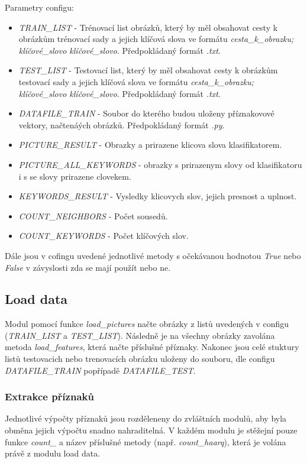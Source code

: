 \documentclass[czech,BP]{thesiskiv}
\begin{document}
\vspace{1cm}
Parametry configu:
\begin{itemize}
	\item \textit{TRAIN\_LIST} - Trénovací list obrázků, který by měl obsahovat cesty k obrázkům trénovací sady a jejich klíčová slova ve formátu \textit{cesta\_k\_obrazku; klíčové\_slovo klíčové\_slovo}. Předpokládaný formát \textit{.txt}.
	\item \textit{TEST\_LIST} - Testovací list, který by měl obsahovat cesty k obrázkům testovací sady a jejich klíčová slova ve formátu \textit{cesta\_k\_obrazku; klíčové\_slovo klíčové\_slovo}. Předpokládaný formát \textit{.txt}.
	\item \textit{DATAFILE\_TRAIN} - Soubor do kterého budou uloženy příznakovové vektory, načtenáých obrázků. Předpokládaný formát \textit{.py}.
	\item \textit{PICTURE\_RESULT} - Obrazky a prirazene klicova slova klasifikatorem.
	\item \textit{PICTURE\_ALL\_KEYWORDS} - obrazky s prirazenym slovy od klasifikatoru i s se slovy prirazene clovekem.
	\item \textit{KEYWORDS\_RESULT} - Vysledky klicovych slov, jejich presnost a uplnost.
	\item \textit{COUNT\_NEIGHBORS} - Počet sousedů.
	\item \textit{COUNT\_KEYWORDS} - Počet klíčových slov.
\end{itemize}
Dále jsou v cofingu uvedené jednotlivé metody s očekávanou hodnotou \textit{True} nebo \textit{False} v závyslosti zda se mají použít nebo ne.

\subsection{Load data}
\par Modul pomocí funkce \textit{load\_pictures} načte obrázky z listů uvedených v configu (\textit{TRAIN\_LIST} a \textit{TEST\_LIST}). Následně je na všechny obrázky zavolána metoda \textit{load\_features}, která načte příslušné příznaky. Nakonec jsou celé stuktury listů testovacich nebo trenovacích obrázku uloženy do souboru, dle configu \textit{DATAFILE\_TRAIN} popřípadě \textit{DATAFILE\_TEST}.


\subsubsection{Extrakce příznaků}
\par Jednotlivé výpočty příznaků jsou rozděleneny do zvláštních modulů, aby byla obměna jejich výpočtu snadno nahraditelná. V každém modulu je stěžejní pouze funkce \textit{count\_} a název příslušné metody (např. \textit{count\_haarq}), která je volána právě z modulu load data.
\end{document}
